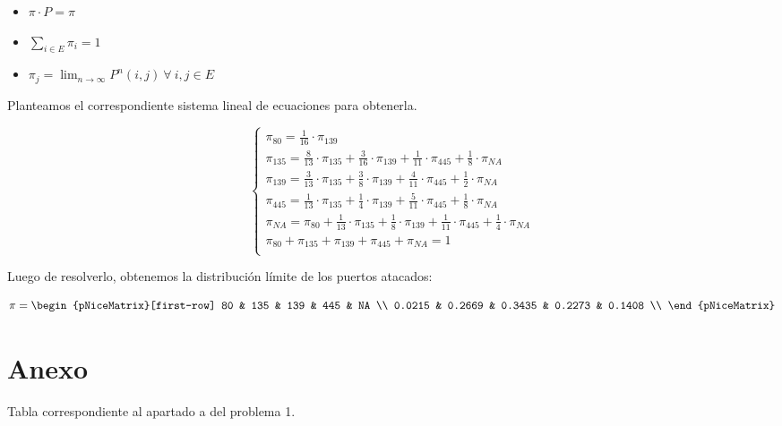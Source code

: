\documentclass[11pt]{article}
\begin{document}
\begin{itemize}
    \item $\pi \cdot P = \pi$
    \item $\sum_{i \in E} \pi_i = 1$
    \item $\pi_j = \lim_{n \to \infty} P^n(i,j)\ \forall\ i,j \in E$
\end{itemize}

Planteamos el correspondiente sistema lineal de ecuaciones para obtenerla.

\begin{equation}
    \begin{cases}
        \pi_{80} = \frac{1}{16} \cdot \pi_{139} \\
        \pi_{135} = \frac{8}{13} \cdot \pi_{135} + \frac{3}{16} \cdot \pi_{139} + \frac{1}{11} \cdot \pi_{445} + \frac{1}{8} \cdot \pi_{NA} \\
        \pi_{139} = \frac{3}{13} \cdot \pi_{135} + \frac{3}{8} \cdot \pi_{139} + \frac{4}{11} \cdot \pi_{445} + \frac{1}{2} \cdot \pi_{NA} \\
        \pi_{445} = \frac{1}{13} \cdot \pi_{135} + \frac{1}{4} \cdot \pi_{139} + \frac{5}{11} \cdot \pi_{445} + \frac{1}{8} \cdot \pi_{NA} \\
        \pi_{NA} = \pi_{80} + \frac{1}{13} \cdot \pi_{135} + \frac{1}{8} \cdot \pi_{139} + \frac{1}{11} \cdot \pi_{445} + \frac{1}{4} \cdot \pi_{NA} \\
        \pi_{80} + \pi_{135} + \pi_{139} + \pi_{445} + \pi_{NA} = 1 \\
    \end{cases}
\end{equation}

Luego de resolverlo, obtenemos la distribución límite de los puertos atacados:

\begin{equation}
    \pi = \begin{pNiceMatrix}[first-row]
        80     & 135    & 139    & 445    & NA     \\
        0.0215 & 0.2669 & 0.3435 & 0.2273 & 0.1408 \\
    \end{pNiceMatrix}
\end{equation}


\section*{Anexo}

Tabla correspondiente al apartado a del problema 1.
\end{document}
